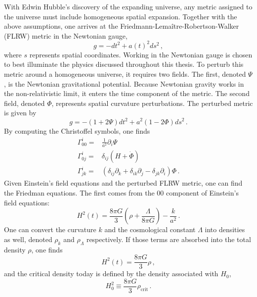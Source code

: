 With Edwin Hubble's discovery of the expanding universe, any metric assigned to the universe must include homogeneous spatial expansion. Together with the above assumptions, one arrives at the Friedmann-Lema\^{i}tre-Robertson-Walker (FLRW) metric in the Newtonian gauge,
\begin{equation}
    g = -dt^2 + a(t)^2 ds^2\,,
\end{equation}
where $s$ represents spatial coordinates. Working in the Newtonian gauge is chosen to best illuminate the physics discussed throughout this thesis. To perturb this metric around a homogeneous universe, it requires two fields. The first, denoted $\Psi$, is the Newtonian gravitational potential. Because Newtonian gravity works in the non-relativistic limit, it enters the time component of the metric. The second field, denoted $\Phi$, represents spatial curvature perturbations. The perturbed metric is given by
\begin{equation}
    g = -(1+2\Psi)dt^2 + a^2(1-2\Phi)ds^2\,.
\end{equation}
By computing the Christoffel symbols, one finds
\begin{equation}
    \begin{split}
        \Gamma^i_{00} =& \frac{1}{a^2}\partial_i\Psi \\
        \Gamma^i_{0j} =& \delta_{ij}(H+\dot\Phi) \\
        \Gamma^i_{jk} =& (\delta_{ij} \partial_k + \delta_{ik}\partial_j - \delta_{jk}\partial_i)\Phi\,.
    \end{split}
\end{equation}
Given Einstein's field equations and the perturbed FLRW metric, one can find the Friedman equations. The first comes from the $00$ component of Einstein's field equations:
\begin{equation}
    H^2(t) = \frac{8\pi G}{3}\left(\rho + \frac{\Lambda}{8\pi G}\right) - \frac{k}{a^2}\,.
\end{equation}
One can convert the curvature $k$ and the cosmological constant $\Lambda$ into densities as well, denoted $\rho_k$ and $\rho_\Lambda$ respectively. If those terms are absorbed into the total density $\rho$, one finds
\begin{equation}
    H^2(t) = \frac{8\pi G}{3}\rho\,,
\end{equation}
and the critical density today is defined by the density associated with $H_0$,
\begin{equation}
    H_0^2 \equiv \frac{8\pi G}{3}\rho_{\mathrm{crit}}\,.
\end{equation}
